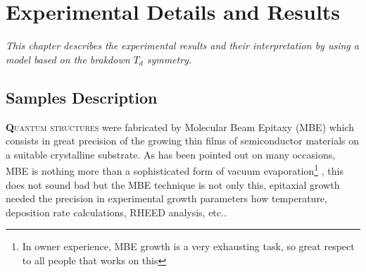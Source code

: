 \chapter{Experimental Details and Results}
\label{chap:experimentals-details-and-results}
\textit{This chapter describes the experimental results and their interpretation by using a model based on the brakdown $T_d$ symmetry.}
\vfill
\minitoc
\newpage

\section{Samples Description}
\label{sec:chapter-3-section-samples-description}
\vspace{-10mm}
\lettrine[lines=3, lraise=.1, nindent=0mm, slope=0mm]{\textbf{Q}}{uantum structures} 
were fabricated by Molecular Beam Epitaxy (MBE) which consists in great precision of the growing thin films of semiconductor materials on a suitable crystalline substrate. As has been pointed out on many occasions, MBE is
nothing more than a sophisticated form of vacuum evaporation\footnote{In owner  experience, MBE growth is a very exhausting task, so great respect to all people that works on this} \cite{orton2015molecular}, this does not sound
bad but the MBE technique is not only this, epitaxial growth needed the precision in experimental growth parameters how temperature, deposition rate calculations, RHEED analysis, etc.\cite{orton2015molecular,grundmann2010physics}.

